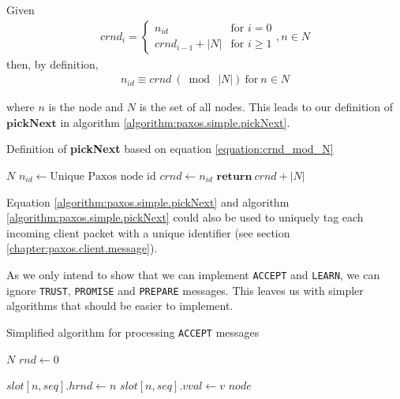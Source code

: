 Given
\begin{gather}
  crnd_i = \left\{
             \begin{array}{ll}
               n_{id} & \mbox{for } i = 0 \\
               crnd_{i-1} + |N| & \mbox{for } i \geq 1
             \end{array}
           \right. , n \in N
  \label{equation:crnd_i}
\end{gather}
then, by definition,
\begin{gather}
  n_{id} \equiv crnd\ (\bmod\ |N|)\ \text{for}\ n \in N
  \label{equation:crnd_mod_N}
\end{gather}

where $n$ is the node and $N$ is the set of all nodes.  This leads to our
definition of $\textbf{pickNext}$ in algorithm
\ref{algorithm:paxos.simple.pickNext}.

\begin{algorithm}
  \caption{Definition of \textbf{pickNext} based on equation \ref{equation:crnd_mod_N}}
  \label{algorithm:paxos.simple.pickNext}
  \begin{algorithmic}
    \State $N$ 
    \State $n_{id} \gets \text{Unique Paxos node id}$
    \State $crnd \gets n_{id}$ 
    \State
      \State $\textbf{return}\ crnd + |N|$ 
    \EndFunction
  \end{algorithmic}
\end{algorithm}

Equation \ref{algorithm:paxos.simple.pickNext} and algorithm
\ref{algorithm:paxos.simple.pickNext} could also be used to uniquely tag
each incoming client packet with a unique identifier (see section
\ref{chapter:paxos.client.message}).

As we only intend to show that we can implement \texttt{ACCEPT} and
\texttt{LEARN}, we can ignore \texttt{TRUST}, \texttt{PROMISE} and
\texttt{PREPARE} messages.
%
This leaves us with simpler algorithms that should be easier to implement.

\begin{algorithm}
  \caption{Simplified algorithm for processing \texttt{ACCEPT} messages}
  \label{algorithm:paxos.simple.acceptor}
  \begin{algorithmic}
    \State $N$
    \State $rnd \gets 0$ 
    \State

        \State $slot[n, seq].hrnd\gets n$
        \State $slot[n, seq].vval\gets v$ 
           \State {}
                         {$node$}
        \EndForIn
      \EndIf
    \EndOn
  \end{algorithmic}
\end{algorithm}

